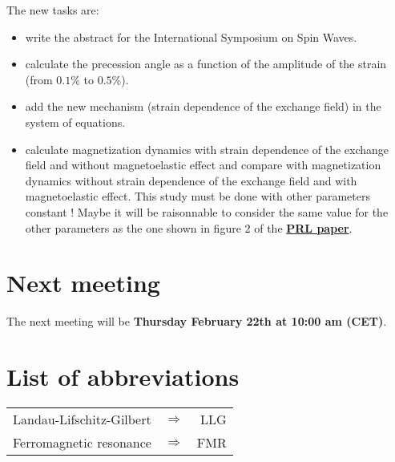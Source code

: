 \documentclass[12pt,a4paper]{article}
\begin{document}
The new tasks are:
\begin{itemize}
    \item write the abstract for the International Symposium on Spin Waves.
    \item calculate the precession angle as a function of the amplitude of the strain (from $0.1\%$ to $0.5\%$).
    \item add the new mechanism (strain dependence of the exchange field) in the system of equations.
    \item calculate magnetization dynamics with strain dependence of the exchange field and without magnetoelastic effect and compare with magnetization dynamics without strain dependence of the exchange field and with magnetoelastic effect.
    This study must be done with other parameters constant !
    Maybe it will be raisonnable to consider the same value for the other parameters as the one shown in figure 2 of the \href{https://www.dropbox.com/s/a8lzw49004nmdfz/2018_Exchange_Magnon_PaperPRL.pdf?dl=1}{\textbf{PRL paper}}.
\end{itemize}

\section*{Next meeting}

The next meeting will be \textbf{Thursday February 22th at 10:00 am (CET)}.

\newpage

\section*{List of abbreviations}

\begin{table}[ht]
    \begin{tabular}{ l c r }
        Landau-Lifschitz-Gilbert & $\Longrightarrow$ & LLG \\
        Ferromagnetic resonance & $\Longrightarrow$ & FMR \\
    \end{tabular}
\end{table}

%
%
\end{document}

